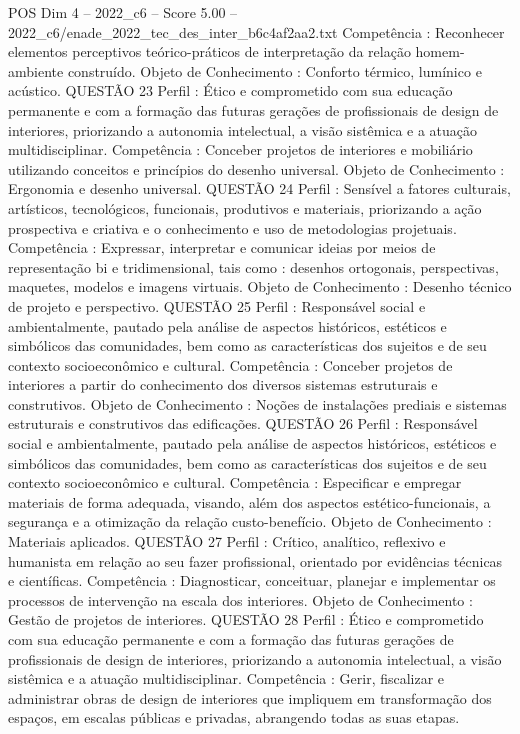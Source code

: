 \begin{textsample}{POS Dim 4 – 2022\_c6 – Score 5.00 – 2022\_c6/enade\_2022\_tec\_des\_inter\_b6c4af2aa2.txt}
Competência : Reconhecer elementos perceptivos teórico-práticos de interpretação da relação homem-ambiente construído.
Objeto de Conhecimento : Conforto térmico, lumínico e acústico.
QUESTÃO 23 Perfil : Ético e comprometido com sua educação permanente e com a formação das futuras gerações de profissionais de design de interiores, priorizando a autonomia intelectual, a visão sistêmica e a atuação multidisciplinar.
Competência : Conceber projetos de interiores e mobiliário utilizando conceitos e princípios do desenho universal.
Objeto de Conhecimento : Ergonomia e desenho universal.
QUESTÃO 24 Perfil : Sensível a fatores culturais, artísticos, tecnológicos, funcionais, produtivos e materiais, priorizando a ação prospectiva e criativa e o conhecimento e uso de metodologias projetuais.
Competência : Expressar, interpretar e comunicar ideias por meios de representação bi e tridimensional, tais como : desenhos ortogonais, perspectivas, maquetes, modelos e imagens virtuais.
Objeto de Conhecimento : Desenho técnico de projeto e perspectivo.
QUESTÃO 25 Perfil : Responsável social e ambientalmente, pautado pela análise de aspectos históricos, estéticos e simbólicos das comunidades, bem como as características dos sujeitos e de seu contexto socioeconômico e cultural.
Competência : Conceber projetos de interiores a partir do conhecimento dos diversos sistemas estruturais e construtivos.
Objeto de Conhecimento : Noções de instalações prediais e sistemas estruturais e construtivos das edificações.
QUESTÃO 26 Perfil : Responsável social e ambientalmente, pautado pela análise de aspectos históricos, estéticos e simbólicos das comunidades, bem como as características dos sujeitos e de seu contexto socioeconômico e cultural.
Competência : Especificar e empregar materiais de forma adequada, visando, além dos aspectos estético-funcionais, a segurança e a otimização da relação custo-benefício.
Objeto de Conhecimento : Materiais aplicados.
QUESTÃO 27 Perfil : Crítico, analítico, reflexivo e humanista em relação ao seu fazer profissional, orientado por evidências técnicas e científicas.
Competência : Diagnosticar, conceituar, planejar e implementar os processos de intervenção na escala dos interiores.
Objeto de Conhecimento : Gestão de projetos de interiores.
QUESTÃO 28 Perfil : Ético e comprometido com sua educação permanente e com a formação das futuras gerações de profissionais de design de interiores, priorizando a autonomia intelectual, a visão sistêmica e a atuação multidisciplinar.
Competência : Gerir, fiscalizar e administrar obras de design de interiores que impliquem em transformação dos espaços, em escalas públicas e privadas, abrangendo todas as suas etapas.

\end{textsample}
